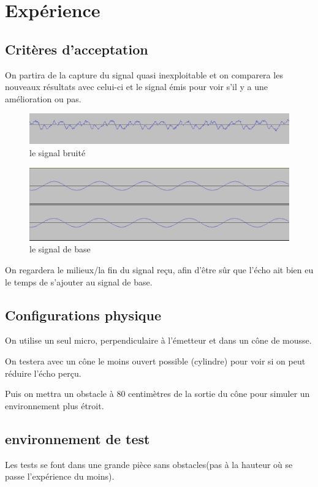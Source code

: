 \section{Expérience}
\subsection{Critères d'acceptation}
On partira de la capture du signal quasi inexploitable et on comparera les nouveaux résultats avec celui-ci et le signal émis pour voir s'il y a une amélioration ou pas.
\begin{figure}[H]
\includegraphics[width=\textwidth]{resources/img/cone_90.png}
\caption{le signal bruité}
\end{figure}
\begin{figure}[H]
\includegraphics[width=\textwidth]{resources/img/sinus_base.png}
\caption{le signal de base}
\end{figure}
On regardera le milieux/la fin du signal reçu, afin d'être sûr que l'écho ait bien eu le temps de s'ajouter au signal de base.


\subsection{Configurations physique}
On utilise un seul micro, perpendiculaire à l'émetteur et dans un cône de mousse.

On testera avec un cône le moins ouvert possible (cylindre) pour voir si on peut réduire l'écho perçu.

Puis on mettra un obstacle à 80 centimètres de la sortie du cône pour simuler un environnement plus étroit.

\subsection{environnement de test}
Les tests se font dans une grande pièce sans obstacles(pas à la hauteur où se passe l'expérience du moins).

